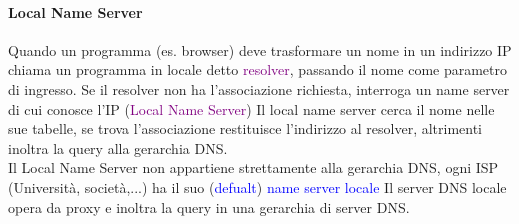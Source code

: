 \paragraph{Local Name Server}
Quando un programma (es. browser) deve trasformare un nome in un indirizzo IP chiama un programma in locale detto \textcolor{purple}{resolver}, passando il nome come parametro di ingresso. 
Se il resolver non ha l’associazione richiesta, interroga un name server di cui conosce l’IP (\textcolor{purple}{Local Name Server})
Il local name server cerca il nome nelle sue tabelle, se trova l’associazione restituisce l’indirizzo al resolver, altrimenti inoltra la query alla gerarchia DNS.
\\Il Local Name Server non appartiene strettamente alla gerarchia DNS, ogni ISP (Università, società,...) ha il suo (\textcolor{blue}{defualt}) \textcolor{blue}{name server locale}
Il server DNS locale opera da proxy e inoltra la query in una gerarchia di server DNS.

